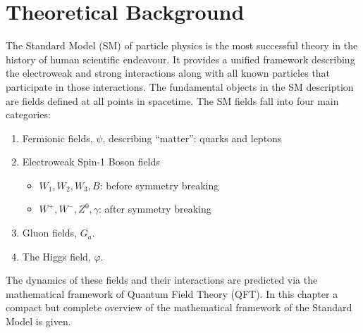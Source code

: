 \graphicspath{{Ch1_Theory/figures/}}

\chapter{Theoretical Background}

The Standard Model (SM) of particle physics is the most successful theory in the history of human scientific endeavour.
It provides a unified framework describing the electroweak and strong interactions along with all known particles that participate in those interactions.
The fundamental objects in the SM description are fields defined at all points in spacetime.
The SM fields fall into four main categories:


\begin{enumerate}
    \item Fermionic fields, $\psi$, describing ``matter'': quarks and leptons
    \item Electroweak Spin-1 Boson fields
        \begin{itemize}
            \item $W_1, W_2, W_3, B$: before symmetry breaking
            \item $W^+, W^-, Z^0, \gamma$: after symmetry breaking
        \end{itemize}
    \item Gluon fields, $G_a$.
    \item The Higgs field, $\varphi$.
\end{enumerate}

The dynamics of these fields and their interactions are predicted via the mathematical framework of Quantum Field Theory (QFT).
In this chapter a compact but complete overview of the mathematical framework of the Standard Model is given.

